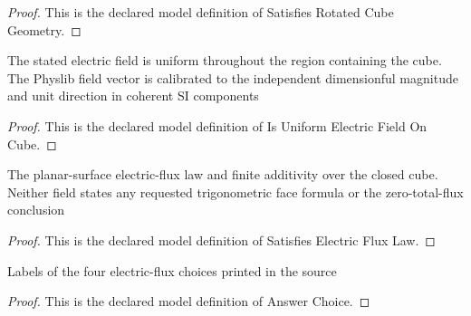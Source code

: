 \begin{proof}
  This is the declared model definition of Satisfies Rotated Cube Geometry.
\end{proof}
\begin{definition}
  \label{def:physics:phyx-mini-0999:phyxminiproblems-problemphyxmini0999-isuniformelectricfieldoncube}
  The stated electric field is uniform throughout the region containing the cube. The Physlib field vector is calibrated to the independent dimensionful magnitude and unit direction in coherent SI components
\end{definition}
\begin{proof}
  This is the declared model definition of Is Uniform Electric Field On Cube.
\end{proof}
\begin{definition}
  \label{def:physics:phyx-mini-0999:phyxminiproblems-problemphyxmini0999-satisfieselectricfluxlaw}
  The planar-surface electric-flux law and finite additivity over the closed cube. Neither field states any requested trigonometric face formula or the zero-total-flux conclusion
\end{definition}
\begin{proof}
  This is the declared model definition of Satisfies Electric Flux Law.
\end{proof}
\begin{definition}
  \label{def:physics:phyx-mini-0999:phyxminiproblems-problemphyxmini0999-answerchoice}
  Labels of the four electric-flux choices printed in the source
\end{definition}
\begin{proof}
  This is the declared model definition of Answer Choice.
\end{proof}
